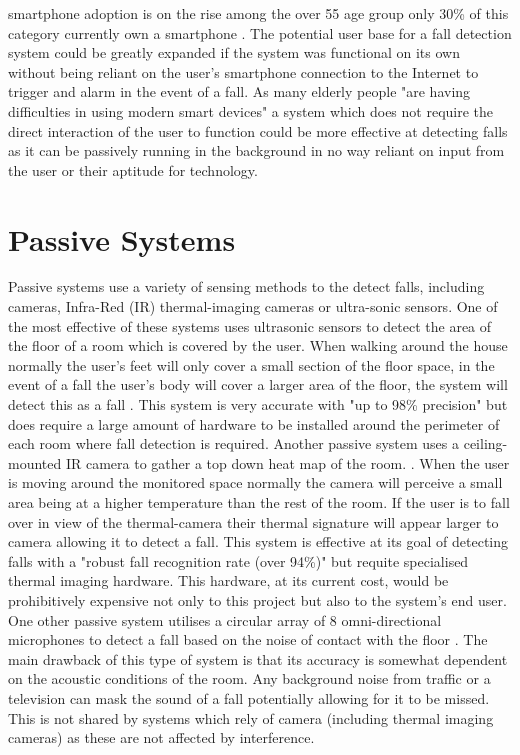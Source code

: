 \documentclass[11pt,a4paper]{report}
\begin{document}
smartphone adoption is on the rise among the over 55 age group only 30\% of this category currently own a smartphone \citep{Berenguer_Are_Smartphones_Ubiquitous}. The potential user base for a fall detection system could be greatly expanded if the system was functional on its own without being reliant on the user's smartphone connection to the Internet to trigger and alarm in the event of a fall. As many elderly people "are having difficulties in using modern smart devices" \citep{William_Cognitive_modeling_in_human_computer_interaction} a system which does not require the direct interaction of the user to function could be more effective at detecting falls as it can be passively running in the background in no way reliant on input from the user or their aptitude for technology.

\section{Passive Systems}
Passive systems use a variety of sensing methods to the detect falls, including cameras, Infra-Red (IR) thermal-imaging cameras or ultra-sonic sensors. One of the most effective of these systems uses ultrasonic sensors to detect the area of the floor of a room which is covered by the user. When walking around the house normally the user's feet will only cover a small section of the floor space, in the event of a fall the user's body will cover a larger area of the floor, the system will detect this as a fall \citep{Chang_Human_fall_detection_based_on_event}. This system is very accurate with "up to 98\% precision" but does require a large amount of hardware to be installed around the perimeter of each room where fall detection is required. Another passive system uses a ceiling-mounted IR camera to gather a top down heat map of the room. \citep{Hayashida_The_use_of_thermal_ir_array}. When the user is moving around the monitored space normally the camera will perceive a small area being at a higher temperature than the rest of the room. If the user is to fall over in view of the thermal-camera their thermal signature will appear larger to camera allowing it to detect a fall. This system is effective at its goal of detecting falls with a "robust fall recognition rate (over 94\%)" but requite specialised thermal imaging hardware. This hardware, at its current cost, would be prohibitively expensive not only to this project but also to the system's end user. One other passive system utilises a circular array of 8 omni-directional microphones to detect a fall based on the noise of contact with the floor \citep{Li_A_microphone_array}. The main drawback of this type of system is that its accuracy is somewhat dependent on the acoustic conditions of the room. Any background noise from traffic or a television can mask the sound of a fall potentially allowing for it to be missed. This is not shared by systems which rely of camera (including thermal imaging cameras) as these are not affected by interference.
\end{document}
